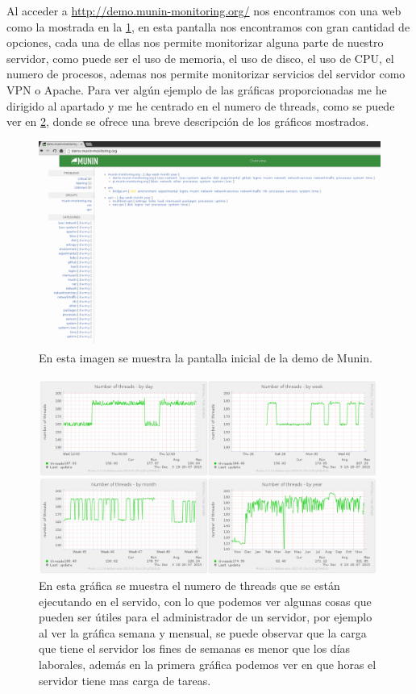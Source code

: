 Al acceder a \url{http://demo.munin-monitoring.org/} nos encontramos con una web como la mostrada en la \cref{fig40}, en esta pantalla nos encontramos con gran cantidad de opciones, cada una de ellas nos permite monitorizar alguna parte de nuestro servidor, como puede ser el uso de memoria, el uso de disco, el uso de CPU, el numero de procesos, ademas nos permite monitorizar servicios del servidor como VPN o Apache. Para ver algún ejemplo de las gráficas proporcionadas me he dirigido al apartado y me he centrado en el numero de threads, como se puede ver en \cref{fig41}, donde se ofrece una breve descripción de los gráficos mostrados.

\begin{figure}[H]
  \begin{center}
    \includegraphics[width=1\textwidth]{imagenes/mun1}
    \caption{En esta imagen se muestra la pantalla inicial de la demo de Munin.}
    \label{fig40}
  \end{center}
\end{figure}

\begin{figure}[H]
  \begin{center}
    \includegraphics[width=1\textwidth]{imagenes/mun2}
    \caption{En esta gráfica se muestra el numero de threads que se están ejecutando en el servido, con lo que podemos ver algunas cosas que pueden ser útiles para el administrador de un servidor, por ejemplo al ver la gráfica semana y mensual, se puede observar que la carga que tiene el servidor los fines de semanas es menor que los días laborales, además en la primera gráfica podemos ver en que horas el servidor tiene mas carga de tareas.}
    \label{fig41}
  \end{center}
\end{figure}


